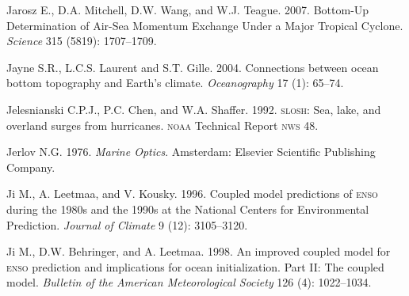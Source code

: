 \begin{thebibliography}{999}
Jarosz E., D.A. Mitchell, D.W. Wang, and W.J. Teague. 2007. Bottom-Up
Determination of Air-Sea Momentum Exchange Under a Major Tropical
Cyclone. \textit{Science} 315 (5819): 1707--1709.
%

Jayne S.R., L.C.S. Laurent and S.T. Gille.  2004. Connections between
ocean bottom topography and Earth's climate. \textit{Oceanography} 17
(1): 65--74.
%

Jelesnianski C.P.J., P.C. Chen, and
W.A. Shaffer. 1992. \textsc{slosh}: Sea, lake, and overland surges
from hurricanes. \textsc{noaa} Technical Report \textsc{nws} 48.
%

Jerlov N.G.  1976. \textit{Marine Optics}. Amsterdam: Elsevier
Scientific Publishing Company.
%

Ji M., A. Leetmaa, and V. Kousky.  1996. Coupled model predictions of
\textsc{enso} during the 1980s and the 1990s at the National Centers
for Environmental Prediction. \textit{Journal of Climate} 9 (12):
3105--3120.
%

Ji M., D.W. Behringer, and A. Leetmaa.  1998. An improved coupled
model for \textsc{enso} prediction and implications for ocean
initialization. Part II: The coupled model. \textit{Bulletin of the
  American Meteorological Society} 126 (4): 1022--1034.
%


\end{thebibliography}
